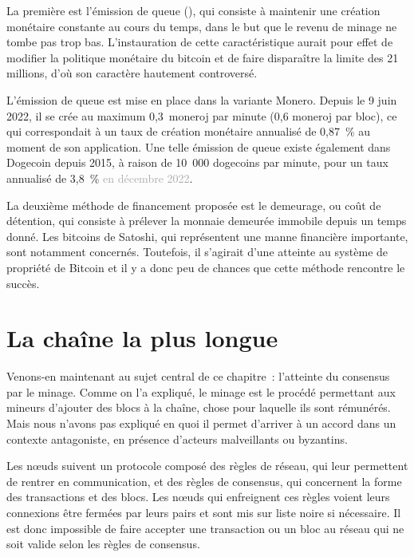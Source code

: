La première est l'émission de queue (), qui consiste à maintenir une création monétaire constante au cours du temps, dans le but que le revenu de minage ne tombe pas trop bas. L'instauration de cette caractéristique aurait pour effet de modifier la politique monétaire du bitcoin et de faire disparaître la limite des 21 millions, d'où son caractère hautement controversé.

L'émission de queue est mise en place dans la variante Monero. Depuis le 9 juin 2022, il se crée au maximum 0,3~moneroj par minute (0,6 moneroj par bloc), ce qui correspondait à un taux de création monétaire annualisé de 0,87~\% au moment de son application. Une telle émission de queue existe également dans Dogecoin depuis 2015, à raison de 10~000 dogecoins par minute, pour un taux annualisé de 3,8~\% \textcolor{darkgray}{en décembre 2022}.

La deuxième méthode de financement proposée est le demeurage, ou coût de détention, qui consiste à prélever la monnaie demeurée immobile depuis un temps donné. Les bitcoins de Satoshi, qui représentent une manne financière importante, sont notamment concernés. Toutefois, il s'agirait d'une atteinte au système de propriété de Bitcoin et il y a donc peu de chances que cette méthode rencontre le succès.

\section*{La chaîne la plus longue}

Venons-en maintenant au sujet central de ce chapitre~: l'atteinte du consensus par le minage. Comme on l'a expliqué, le minage est le procédé permettant aux mineurs d'ajouter des blocs à la chaîne, chose pour laquelle ils sont rémunérés. Mais nous n'avons pas expliqué en quoi il permet d'arriver à un accord dans un contexte antagoniste, en présence d'acteurs malveillants ou byzantins.

Les nœuds suivent un protocole composé des règles de réseau, qui leur permettent de rentrer en communication, et des règles de consensus, qui concernent la forme des transactions et des blocs. Les nœuds qui enfreignent ces règles voient leurs connexions être fermées par leurs pairs et sont mis sur liste noire si nécessaire. Il est donc impossible de faire accepter une transaction ou un bloc au réseau qui ne soit valide selon les règles de consensus.

